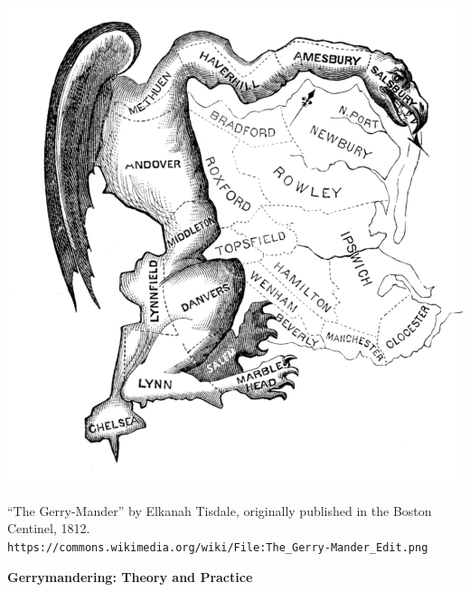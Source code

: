 \documentclass[12pt]{article}
\begin{document}
\begin{center}
\includegraphics[width=\textwidth]{map-0.png}

``The Gerry-Mander'' by Elkanah Tisdale, originally published in the Boston Centinel, 1812. \\
\texttt{https://commons.wikimedia.org/wiki/File:The\_Gerry-Mander\_Edit.png}

\vspace{2em}

\textbf{\LARGE Gerrymandering: Theory and Practice}
\end{center}
\end{document}
